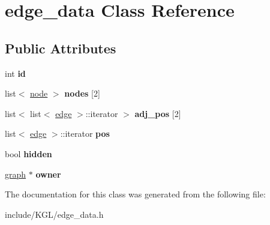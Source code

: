 \hypertarget{classedge__data}{}\section{edge\+\_\+data Class Reference}
\label{classedge__data}
\subsection*{Public Attributes}
\begin{DoxyCompactItemize}
\item 
\mbox{\label{classedge__data_a33597ce417f8d86697b03fc8b6fea526}} 
int {\bfseries id}
\item 
\mbox{\label{classedge__data_a57692abe3b0672d8020e7554a76a0f35}} 
list$<$ \mbox{\hyperlink{classnode}{node}} $>$ {\bfseries nodes} \mbox{[}2\mbox{]}
\item 
\mbox{\label{classedge__data_a49960df0462c61f8830e76c65eb85cce}} 
list$<$ list$<$ \mbox{\hyperlink{classedge}{edge}} $>$\+::iterator $>$ {\bfseries adj\+\_\+pos} \mbox{[}2\mbox{]}
\item 
\mbox{\label{classedge__data_acc25b12e22f5568a90b216d4deca90b5}} 
list$<$ \mbox{\hyperlink{classedge}{edge}} $>$\+::iterator {\bfseries pos}
\item 
\mbox{\label{classedge__data_af8dc68051e5fe3336aa31ae1f3e104c3}} 
bool {\bfseries hidden}
\item 
\mbox{\label{classedge__data_a00436f2956a69cd9dc8e5bfa530e0ce9}} 
\mbox{\hyperlink{classgraph}{graph}} $\ast$ {\bfseries owner}
\end{DoxyCompactItemize}


The documentation for this class was generated from the following file\+:\begin{DoxyCompactItemize}
\item 
include/\+K\+G\+L/edge\+\_\+data.\+h\end{DoxyCompactItemize}
